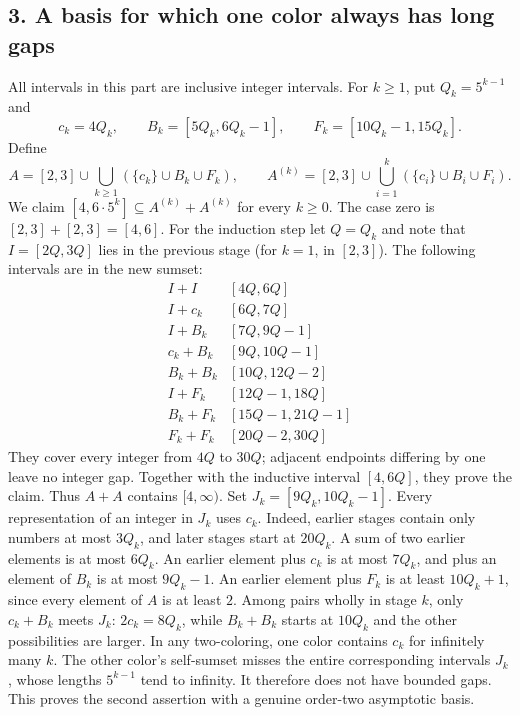 \subsection*{3. A basis for which one color always has long gaps}
All intervals in this part are inclusive integer intervals. For $k\ge1$, put $Q_k=5^{k-1}$ and
\[
 c_k=4Q_k,\qquad B_k=[5Q_k,6Q_k-1],\qquad F_k=[10Q_k-1,15Q_k].
\]
Define
\[
 A=[2,3]\cup\bigcup_{k\ge1}(\{c_k\}\cup B_k\cup F_k),
 \qquad A^{(k)}=[2,3]\cup\bigcup_{i=1}^k(\{c_i\}\cup B_i\cup F_i).
\]
We claim $[4,6\cdot5^k]\subseteq A^{(k)}+A^{(k)}$ for every $k\ge0$. The case zero is $[2,3]+[2,3]=[4,6]$. For the induction step let $Q=Q_k$ and note that $I=[2Q,3Q]$ lies in the previous stage (for $k=1$, in $[2,3]$). The following intervals are in the new sumset:
\[
\begin{array}{c|c}
 I+I &[4Q,6Q]\\
 I+c_k &[6Q,7Q]\\
 I+B_k &[7Q,9Q-1]\\
 c_k+B_k &[9Q,10Q-1]\\
 B_k+B_k &[10Q,12Q-2]\\
 I+F_k &[12Q-1,18Q]\\
 B_k+F_k &[15Q-1,21Q-1]\\
 F_k+F_k &[20Q-2,30Q]
\end{array}
\]
They cover every integer from $4Q$ to $30Q$; adjacent endpoints differing by one leave no integer gap. Together with the inductive interval $[4,6Q]$, they prove the claim. Thus $A+A$ contains $[4,\infty)$.
Set $J_k=[9Q_k,10Q_k-1]$. Every representation of an integer in $J_k$ uses $c_k$. Indeed, earlier stages contain only numbers at most $3Q_k$, and later stages start at $20Q_k$. A sum of two earlier elements is at most $6Q_k$. An earlier element plus $c_k$ is at most $7Q_k$, and plus an element of $B_k$ is at most $9Q_k-1$. An earlier element plus $F_k$ is at least $10Q_k+1$, since every element of $A$ is at least $2$. Among pairs wholly in stage $k$, only $c_k+B_k$ meets $J_k$: $2c_k=8Q_k$, while $B_k+B_k$ starts at $10Q_k$ and the other possibilities are larger.
In any two-coloring, one color contains $c_k$ for infinitely many $k$. The other color's self-sumset misses the entire corresponding intervals $J_k$, whose lengths $5^{k-1}$ tend to infinity. It therefore does not have bounded gaps. This proves the second assertion with a genuine order-two asymptotic basis.

